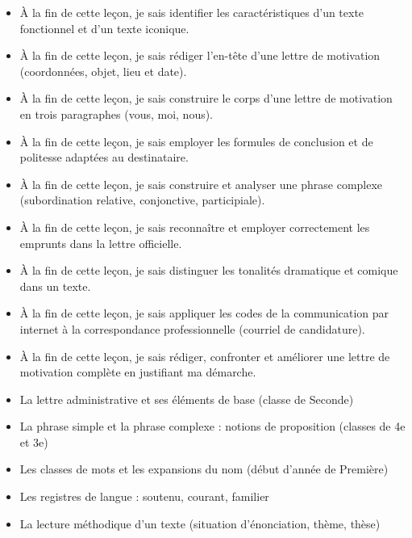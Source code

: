 \documentclass[11pt]{article}
\begin{document}
\begin{objectifs}
\begin{itemize}
\item À la fin de cette leçon, je sais identifier les caractéristiques d'un texte fonctionnel et d'un texte iconique.
\item À la fin de cette leçon, je sais rédiger l'en-tête d'une lettre de motivation (coordonnées, objet, lieu et date).
\item À la fin de cette leçon, je sais construire le corps d'une lettre de motivation en trois paragraphes (vous, moi, nous).
\item À la fin de cette leçon, je sais employer les formules de conclusion et de politesse adaptées au destinataire.
\item À la fin de cette leçon, je sais construire et analyser une phrase complexe (subordination relative, conjonctive, participiale).
\item À la fin de cette leçon, je sais reconnaître et employer correctement les emprunts dans la lettre officielle.
\item À la fin de cette leçon, je sais distinguer les tonalités dramatique et comique dans un texte.
\item À la fin de cette leçon, je sais appliquer les codes de la communication par internet à la correspondance professionnelle (courriel de candidature).
\item À la fin de cette leçon, je sais rédiger, confronter et améliorer une lettre de motivation complète en justifiant ma démarche.
\end{itemize}
\end{objectifs}

\begin{prerequis}
\begin{itemize}
\item La lettre administrative et ses éléments de base (classe de Seconde)
\item La phrase simple et la phrase complexe : notions de proposition (classes de 4e et 3e)
\item Les classes de mots et les expansions du nom (début d'année de Première)
\item Les registres de langue : soutenu, courant, familier
\item La lecture méthodique d'un texte (situation d'énonciation, thème, thèse)
\end{itemize}
\end{prerequis}

\newpage
\end{document}
